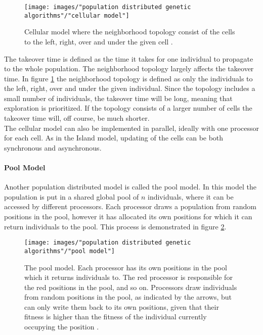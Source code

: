 \begin{figure}[h!]
\begin{center}
\texttt{[image: images/"population distributed genetic algorithms"/"cellular model"]}
\caption{Cellular model where the neighborhood topology consist of the cells to the left, right, over and under the given cell \citep{Gong}.}
\label{Cellular model}
\end{center}
\end{figure}


\noindent The takeover time is defined as the time it takes for one individual to propagate to the whole population. The neighborhood topology largely affects the takeover time. In figure \ref{Cellular model} the neighborhood topology is defined as only the individuals to the left, right, over and under the given individual. Since the topology includes a small number of individuals, the takeover time will be long, meaning that exploration is prioritized. If the topology consists of a larger number of cells the takeover time will, off course, be much shorter.\\


\noindent The cellular model can also be implemented in parallel, ideally with one processor for each cell. As in the Island model, updating of the cells can be both synchronous and asynchronous.


\paragraph*{Pool Model}
Another population distributed model is called the pool model. In this model the population is put in a shared global pool of $n$ individuals, where it can be accessed by different processors. Each processor draws a population from random positions in the pool, however it has allocated its own positions for which it can return individuals to the pool. This process is demonstrated in figure \ref{Pool Model}. \\


\begin{figure}[h!]
\begin{center}
\texttt{[image: images/"population distributed genetic algorithms"/"pool model"]}
\caption{The pool model. Each processor has its own positions in the pool which it returns individuals to. The red processor is responsible for the red positions in the pool, and so on. Processors draw individuals from random positions in the pool, as indicated by the arrows, but can only write them back to its own positions, given that their fitness is higher than the fitness of the individual currently occupying the position \citep{Gong}.}
\label{Pool Model}
\end{center}
\end{figure}


